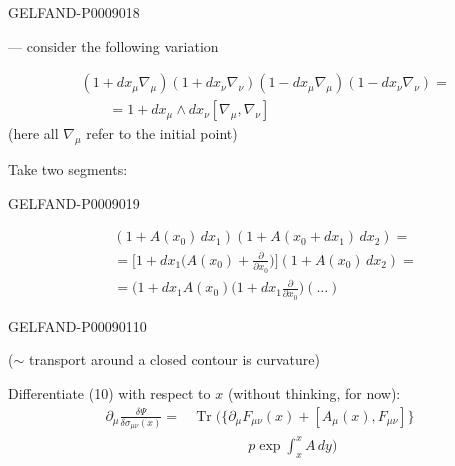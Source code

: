 \begin{GelfandAdjacentEvidence}{GELFAND-P000901}{8}


--- consider the following variation

\begin{equation*}
\begin{aligned}
&(1+dx_\mu\nabla_\mu)(1+dx_\nu\nabla_\nu)
(1-dx_\mu\nabla_\mu)(1-dx_\nu\nabla_\nu)=\\
&\qquad=1+dx_\mu\wedge dx_\nu[\nabla_\mu,\nabla_\nu]
\end{aligned}
\tag{13}
\end{equation*}
(here all $\nabla_\mu$ refer to the initial point)

Take two segments:
\end{GelfandAdjacentEvidence}
\begin{GelfandAdjacentEvidence}{GELFAND-P000901}{9}


\begin{equation*}
\begin{aligned}
&(1+A(x_0)\,dx_1)(1+A(x_0+dx_1)\,dx_2)=\\
&=\biggl[1+dx_1\biggl(A(x_0)+\frac{\partial}{\partial x_0}\biggr)\biggr](1+A(x_0)\,dx_2)=\\
&=\bigl(1+dx_1 A(x_0)\biggl(1+dx_1\frac{\partial}{\partial x_0}\biggr)(\ldots)
\end{aligned}
\tag{14}
\end{equation*}
\end{GelfandAdjacentEvidence}
\begin{GelfandAdjacentEvidence}{GELFAND-P000901}{10}


($\sim$ transport around a closed contour is curvature)

Differentiate (10) with respect to $x$ (without thinking, for now):
\begin{equation*}
\begin{aligned}
\partial_\mu\frac{\delta\Psi}{\delta\sigma_{\mu\nu}(x)}
={}&\operatorname{Tr}\biggl(\{\partial_\mu F_{\mu\nu}(x)+[A_\mu(x),F_{\mu\nu}]\}\\
&\hspace{4em}p\exp\int_x^x A\,dy\biggr)
\end{aligned}
\tag{15}
\end{equation*}
\end{GelfandAdjacentEvidence}


